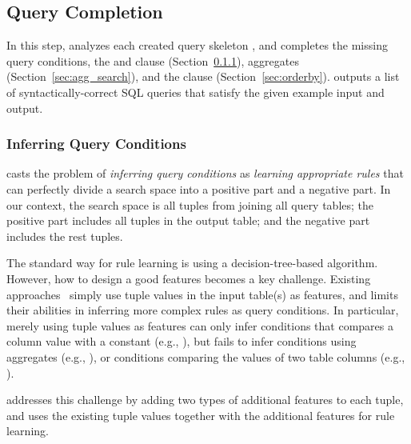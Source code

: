 \subsection{Query Completion}
\label{sec:completion}



In this step, \ourtool analyzes each created query skeleton
, and completes the missing query conditions, the
 and  clause (Section~\ref{sec:condition}),
aggregates (Section~\ref{sec:agg_search}), and
the  clause (Section~\ref{sec:orderby}).
\ourtool outputs a list of syntactically-correct SQL queries
that satisfy the given example input and output.



\subsubsection{Inferring Query Conditions}
\label{sec:condition}

\ourtool casts the problem of \textit{inferring query conditions} as
 \textit{learning appropriate rules} that can perfectly divide a search space
into a positive part and a negative part. In our context, the search space
is all tuples from joining all query tables; the positive part
includes all tuples in the output table; and the negative part includes the rest
tuples.

The standard way for rule learning is using a decision-tree-based
algorithm. However, how to design a good features
becomes a key challenge.
Existing approaches~\cite{Tran:2009} simply use
tuple values in the input table(s) as features, 
and limits their abilities in inferring more
complex rules as query conditions. In particular,
merely using tuple values as features can only infer
conditions that compares a column value with a constant
(e.g., ), but
fails to infer conditions using aggregates (e.g., ),
or conditions comparing the values of two table columns
(e.g., ).



\ourtool addresses this challenge by adding two types of
additional features to each tuple, and uses
the existing tuple values together with the additional features
for rule learning.

